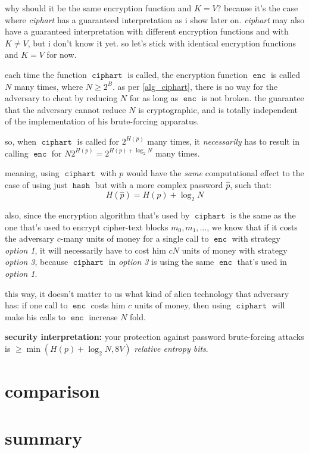 \documentclass[twocolumn]{article}
\DeclareMathOperator{\enc}{\texttt{enc}}
\DeclareMathOperator{\hash}{\texttt{hash}}
\DeclareMathOperator{\kdf}{\texttt{ciphart}}
\begin{document}
why should it be the same encryption function and $K=V$?  because it's the
case where \emph{ciphart} has a guaranteed interpretation as i show later
on.  \emph{ciphart} may also have a guaranteed interpretation with
different encryption functions and with $K \ne V$, but i don't know it yet.
so let's stick with identical encryption functions and $K=V$ for now.

each time the function $\kdf$ is called, the encryption function $\enc$ is
called $N$ many times, where $N\ge2^B$.  as per \cref{alg_ciphart}, there
is no way for the adversary to cheat by reducing $N$ for as long as $\enc$
is not broken.  the guarantee that the adversary cannot reduce $N$ is
cryptographic, and is totally independent of the implementation of his
brute-forcing apparatus.

so, when $\kdf$ is called for $2^{H(p)}$ many times, it \emph{necessarily}
has to result in calling $\enc$ for $N2^{H(p)} = 2^{H(p) + \log_2N}$ many
times.

meaning, using $\kdf$ with $p$ would have the \emph{same} computational
effect to the case of using just $\hash$ but with a more complex password
$\hat p$, such that:
\begin{equation}
    H(\hat p) = H(p) + \log_2 N
\end{equation}

also, since the encryption algorithm that's used by $\kdf$ is the same as
the one that's used to encrypt cipher-text blocks $m_0, m_1, \ldots$, we
know that if it costs the adversary $c$-many units of money for a single
call to $\enc$ with strategy \emph{option 1}, it will necessarily have to
cost him $cN$ units of money with strategy \emph{option 3}, because $\kdf$
in \emph{option 3} is using the same $\enc$ that's used in \emph{option 1}.

this way, it doesn't matter to us what kind of alien technology that
adversary has:  if one call to $\enc$ costs him $c$ units of money, then
using $\kdf$ will make his calls to $\enc$ increase $N$ fold.

\textbf{security interpretation:}  your protection against password
brute-forcing attacks is $\ge \min(H(p) + \log_2 N, 8V)$ \emph{relative
entropy bits}.

\section{comparison}
\section{summary}
\end{document}
